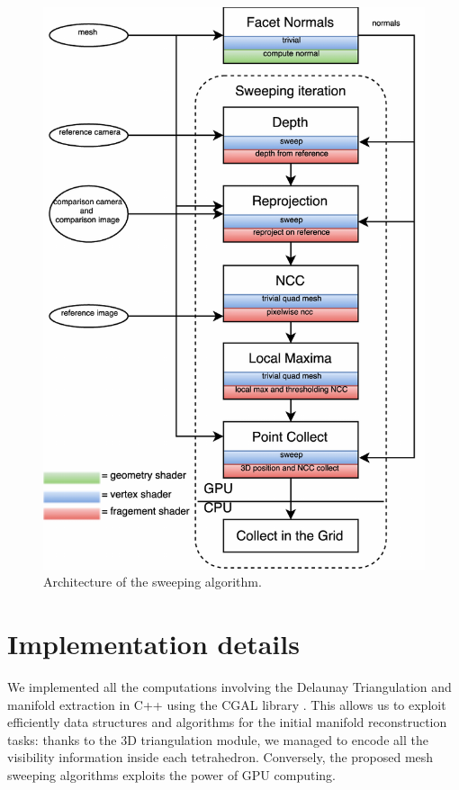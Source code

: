 \begin{figure}[tp]
\centering
\includegraphics[height=0.83\textheight]{./img/ch-sweep/Sweep-shaders-architecture}
\caption{Architecture of the sweeping algorithm.}
\label{fig:sweep-arch}
\end{figure}

\section{Implementation details}
\label{sec:opengl_sweep}
We implemented all the computations involving the Delaunay Triangulation and manifold extraction in C++ using the CGAL library \cite{cgal}. This allows us to exploit efficiently data structures and algorithms for the initial manifold reconstruction tasks: thanks to the 3D triangulation module, we managed to encode all the visibility information inside each tetrahedron.
Conversely, the proposed mesh sweeping algorithms exploits the power of GPU computing. 
